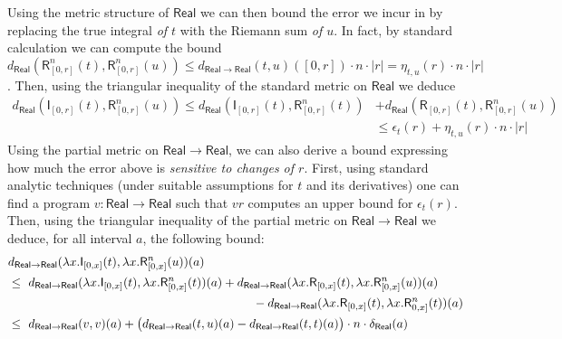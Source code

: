 \begin{example}
Using the metric structure of $\mathsf{Real}$ we can then bound the error we incur in by replacing the true integral \emph{of $t$} with the Riemann sum \emph{of $u$}. 
In fact, by standard calculation we can compute the bound
$d_{\mathsf{Real}} ( \mathsf{R}^{n}_{[0,r]}(t), \mathsf R^{n}_{[0,r]}(u))\leq 
d_{\mathsf{Real}\to\mathsf{Real}}(t, u)([0,r]) \cdot n \cdot |r|=\eta_{t,u}(r)\cdot n \cdot |r|$.
Then, using the triangular inequality of the standard metric on $\mathsf{Real}$ we deduce
\begin{align*}
 d_{\mathsf{Real}} ( \mathsf{I}_{[0,r]}(t), \mathsf R^{n}_{[0,r]}(u)) \leq
d_{\mathsf{Real}} ( \mathsf{I}_{[0,r]}(t), \mathsf R^{n}_{[0,r]}(t))  & +
d_{\mathsf{Real}} ( \mathsf{R}_{[0,r]}(t),\mathsf R^{n}_{[0,r]}(u)) \\
& \leq \epsilon_{t}(r)
+ 
\eta_{t,u}(r)\cdot 
 n\cdot |r|
 \end{align*}
 Using the partial metric on $\mathsf{Real}\to \mathsf{Real}$, we can also derive a bound expressing how much the error above is \emph{sensitive to changes of $r$}. 
First, using standard analytic techniques (under suitable assumptions for $t$ and its derivatives) one can find a program $v:\mathsf{Real}\to\mathsf{Real}$ such that $vr $ computes an upper bound for $\epsilon_{t}(r)$. 
Then, using the triangular inequality of the partial metric on $\mathsf{Real}\to \mathsf{Real}$ we deduce, for all interval $a$, the following bound:
\begin{align*}
& d_{\mathsf{Real}\to\mathsf{Real}} (\lambda x. \mathsf{I}_{[0,x]}(t),\lambda x. \mathsf R^{n}_{[0,x]}(u))(a) \\
 &\leq \
d_{\mathsf{Real}\to\mathsf{Real}} ( \lambda x.\mathsf{I}_{[0,x]}(t), \lambda x.\mathsf R^{n}_{[0,x]}(t))(a) +
d_{\mathsf{Real}\to\mathsf{Real}} ( \lambda x.\mathsf{R}_{[0,x]}(t), \lambda x.\mathsf R^{n}_{[0,x]}(u))(a) \\
 & \qquad\qquad\qquad\qquad\qquad\qquad\qquad\qquad\qquad\qquad
- d_{\mathsf{Real}\to\mathsf{Real}} ( \lambda x.\mathsf{R}_{[0,x]}(t), \allowbreak \lambda x. \mathsf R^{n}_{0,x]}(t))(a) \\
 & \leq \ 
d_{\mathsf{Real}\to \mathsf{Real}}(v,v)(a)
 +
 \big( d_{\mathsf{Real}\to\mathsf{Real}}(t,u)(a)- d_{\mathsf{Real}\to\mathsf{Real}}(t,t)(a)\big)\cdot n\cdot \diam_{\mathsf{Real}}(a)
\end{align*}
\end{example}



